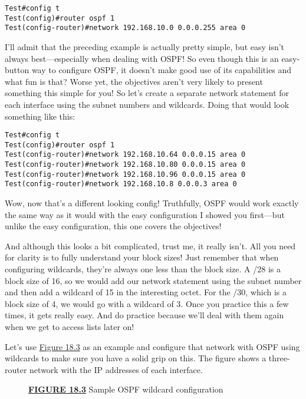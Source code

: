 \begin{verbatim}
Test#config t
Test(config)#router ospf 1
Test(config-router)#network 192.168.10.0 0.0.0.255 area 0
\end{verbatim}

I'll admit that the preceding example is actually pretty simple, but
easy isn't always best---especially when dealing with OSPF! So even
though this is an easy-button way to configure OSPF, it doesn't make
good use of its capabilities and what fun is that? Worse
\protect\hypertarget{c18.xhtmlux5cux23Page_756}{}{}yet, the objectives
aren't very likely to present something this simple for you! So let's
create a separate network statement for each interface using the subnet
numbers and wildcards. Doing that would look something like this:

\begin{verbatim}
Test#config t
Test(config)#router ospf 1
Test(config-router)#network 192.168.10.64 0.0.0.15 area 0
Test(config-router)#network 192.168.10.80 0.0.0.15 area 0
Test(config-router)#network 192.168.10.96 0.0.0.15 area 0
Test(config-router)#network 192.168.10.8 0.0.0.3 area 0
\end{verbatim}

Wow, now that's a different looking config! Truthfully, OSPF would work
exactly the same way as it would with the easy configuration I showed
you first---but unlike the easy configuration, this one covers the
objectives!

And although this looks a bit complicated, trust me, it really isn't.
All you need for clarity is to fully understand your block sizes! Just
remember that when configuring wildcards, they're always one less than
the block size. A /28 is a block size of 16, so we would add our network
statement using the subnet number and then add a wildcard of 15 in the
interesting octet. For the /30, which is a block size of 4, we would go
with a wildcard of 3. Once you practice this a few times, it gets really
easy. And do practice because we'll deal with them again when we get to
access lists later on!

Let's use \protect\hyperlink{c18.xhtmlux5cux23figure18-3}{Figure 18.3}
as an example and configure that network with OSPF using wildcards to
make sure you have a solid grip on this. The figure shows a three-router
network with the IP addresses of each interface.

\begin{figure}
\centering
\caption{{\protect\hyperlink{c18.xhtmlux5cux23figureanchor18-3}{\textbf{FIGURE
18.3}} Sample OSPF wildcard configuration}}
\end{figure}

